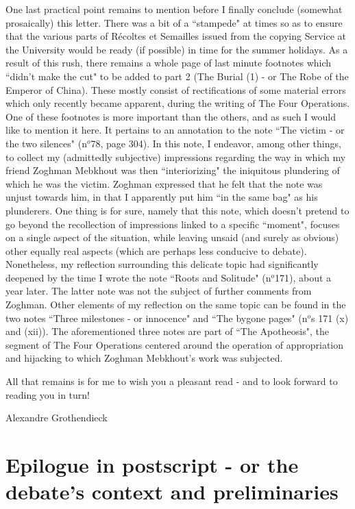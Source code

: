 One last practical point remains to mention before I finally conclude (somewhat prosaically) this letter. There was a bit of a ``stampede" at times so as to ensure that the various parts of R\'ecoltes et Semailles issued from the copying Service at the University would be ready (if possible) in time for the summer holidays. As a result of this rush, there remains a whole page of last minute footnotes which ``didn't make the cut" to be added to part 2 (The Burial (1) - or The Robe of the Emperor of China). These mostly consist of rectifications of some material errors which only recently became apparent, during the writing of The Four Operations. One of these footnotes is more important than the others, and as such I would like to mention it here. It pertains to an annotation to the note ``The victim - or the two silences" (n$^o$78, page 304). In this note, I endeavor, among other things, to collect my (admittedly subjective) impressions regarding the way in which my friend Zoghman Mebkhout was then ``interiorizing" the iniquitous plundering of which he was the victim. Zoghman expressed that he felt that the note was unjust towards him, in that I apparently put him ``in the same bag" as his plunderers. One thing is for sure, namely that this note, which doesn't pretend to go beyond the recollection of impressions linked to a specific ``moment", focuses on a single aspect of the situation, while leaving unsaid (and surely as obvious) other equally real aspects (which are perhaps less conducive to debate). Nonetheless, my reflection surrounding this delicate topic had significantly deepened by the time I wrote the note ``Roots and Solitude" (n$^o$171), about a year later. The latter note was not the subject of further comments from Zoghman. Other elements of my reflection on the same topic can be found in the two notes ``Three milestones - or innocence" and ``The bygone pages" (n$^o$s 171 (x) and (xii)). The aforementioned three notes are part of ``The Apotheosis", the segment of The Four Operations centered around the operation of appropriation and hijacking to which Zoghman Mebkhout's work was subjected.

All that remains is for me to wish you a pleasant read - and to look forward to reading you in turn!

\begin{flushright}
Alexandre Grothendieck
\end{flushright}

\section*{Epilogue in postscript - or the debate's context and preliminaries}

